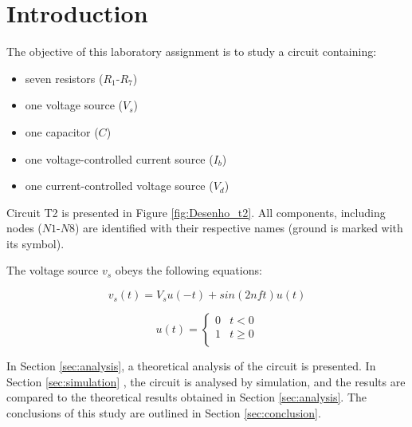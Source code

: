 
\section{Introduction}
\label{sec:introduction}


The objective of this laboratory assignment is to study a circuit containing:
\begin{itemize}
	\item seven resistors ($R_1$-$R_7$)
	\item one voltage source ($V_s$)
	\item one capacitor ($C$)
	\item one voltage-controlled current source ($I_b$)
	\item one current-controlled voltage source ($V_d$)
\end{itemize}


Circuit T2 is presented in Figure \ref{fig:Desenho_t2}. All components, including nodes
($N1$-$N8$) are identified with their respective names (ground is marked with its symbol).

The voltage source $v_s$ obeys the following equations:


\begin{equation}
	v_s(t) = V_su(-t) + sin(2nft)u(t)
\end{equation}

\[ 
u(t)= \left\{
\begin{array}{ll}
      0 & t < 0 \\
      1 & t \geq 0 \\
\end{array} 
\right. 
\]


In Section \ref{sec:analysis}, a theoretical analysis of
the circuit is presented. In Section \ref{sec:simulation} , the circuit is analysed by
simulation, and the results are compared to the theoretical results obtained in Section
\ref{sec:analysis}. The conclusions of this study are outlined in Section \ref{sec:conclusion}.


